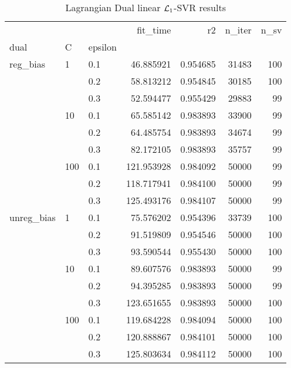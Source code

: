 \begin{table}[H]
\centering
\caption{Lagrangian Dual linear $\protect \mathcal{L}_1$-SVR results}
\label{linear_lagrangian_dual_l1_svr_cv_results}
\begin{tabular}{lllrrrr}
\toprule
           &     &     &    fit\_time &        r2 &  n\_iter &  n\_sv \\
dual & C & epsilon &             &           &         &       \\
\midrule
reg\_bias & 1   & 0.1 &   46.885921 &  0.954685 &   31483 &   100 \\
           &     & 0.2 &   58.813212 &  0.954845 &   30185 &   100 \\
           &     & 0.3 &   52.594477 &  0.955429 &   29883 &    99 \\
           & 10  & 0.1 &   65.585142 &  0.983893 &   33900 &    99 \\
           &     & 0.2 &   64.485754 &  0.983893 &   34674 &    99 \\
           &     & 0.3 &   82.172105 &  0.983893 &   35757 &    99 \\
           & 100 & 0.1 &  121.953928 &  0.984092 &   50000 &    99 \\
           &     & 0.2 &  118.717941 &  0.984100 &   50000 &    99 \\
           &     & 0.3 &  125.493176 &  0.984107 &   50000 &    99 \\
unreg\_bias & 1   & 0.1 &   75.576202 &  0.954396 &   33739 &   100 \\
           &     & 0.2 &   91.519809 &  0.954546 &   50000 &   100 \\
           &     & 0.3 &   93.590544 &  0.955430 &   50000 &   100 \\
           & 10  & 0.1 &   89.607576 &  0.983893 &   50000 &    99 \\
           &     & 0.2 &   94.395285 &  0.983893 &   50000 &    99 \\
           &     & 0.3 &  123.651655 &  0.983893 &   50000 &   100 \\
           & 100 & 0.1 &  119.684228 &  0.984094 &   50000 &   100 \\
           &     & 0.2 &  120.888867 &  0.984101 &   50000 &   100 \\
           &     & 0.3 &  125.803634 &  0.984112 &   50000 &   100 \\
\bottomrule
\end{tabular}
\end{table}
